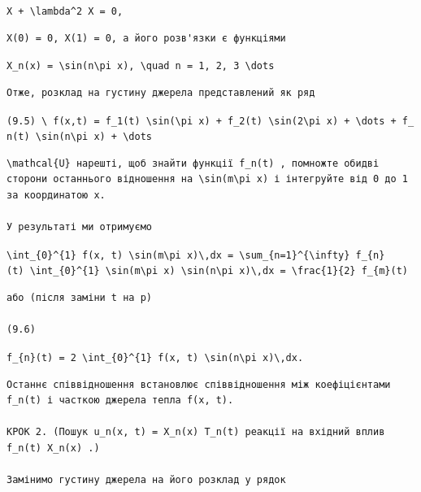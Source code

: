 \documentclass[
  ukrainian,
]{article}
\begin{document}
\texttt{X\textquotesingle{}\textquotesingle{}\ +\ \textbackslash{}lambda\^{}2\ X\ =\ 0,}

\begin{verbatim}
X(0) = 0, X(1) = 0, а його розв'язки є функціями
\end{verbatim}

\texttt{X\_n(x)\ =\ \textbackslash{}sin(n\textbackslash{}pi\ x),\ \textbackslash{}quad\ n\ =\ 1,\ 2,\ 3\ \textbackslash{}dots}

\begin{verbatim}
Отже, розклад на густину джерела представлений як ряд
\end{verbatim}

\texttt{(9.5)\ \textbackslash{}\ f(x,t)\ =\ f\_1(t)\ \textbackslash{}sin(\textbackslash{}pi\ x)\ +\ f\_2(t)\ \textbackslash{}sin(2\textbackslash{}pi\ x)\ +\ \textbackslash{}dots\ +\ f\_n(t)\ \textbackslash{}sin(n\textbackslash{}pi\ x)\ +\ \textbackslash{}dots}

\begin{verbatim}
\mathcal{U} нарешті, щоб знайти функції f_n(t) , помножте обидві сторони останнього відношення на \sin(m\pi x) і інтегруйте від 0 до 1 за координатою x.

У результаті ми отримуємо
\end{verbatim}

\texttt{\textbackslash{}int\_\{0\}\^{}\{1\}\ f(x,\ t)\ \textbackslash{}sin(m\textbackslash{}pi\ x)\textbackslash{},dx\ =\ \textbackslash{}sum\_\{n=1\}\^{}\{\textbackslash{}infty\}\ f\_\{n\}(t)\ \textbackslash{}int\_\{0\}\^{}\{1\}\ \textbackslash{}sin(m\textbackslash{}pi\ x)\ \textbackslash{}sin(n\textbackslash{}pi\ x)\textbackslash{},dx\ =\ \textbackslash{}frac\{1\}\{2\}\ f\_\{m\}(t)}

\begin{verbatim}
або (після заміни t на p)

(9.6)
\end{verbatim}

\texttt{f\_\{n\}(t)\ =\ 2\ \textbackslash{}int\_\{0\}\^{}\{1\}\ f(x,\ t)\ \textbackslash{}sin(n\textbackslash{}pi\ x)\textbackslash{},dx.}

\begin{verbatim}
Останнє співвідношення встановлює співвідношення між коефіцієнтами f_n(t) і часткою джерела тепла f(x, t).

КРОК 2. (Пошук u_n(x, t) = X_n(x) T_n(t) реакції на вхідний вплив f_n(t) X_n(x) .)

Замінимо густину джерела на його розклад у рядок
\end{verbatim}
\end{document}
